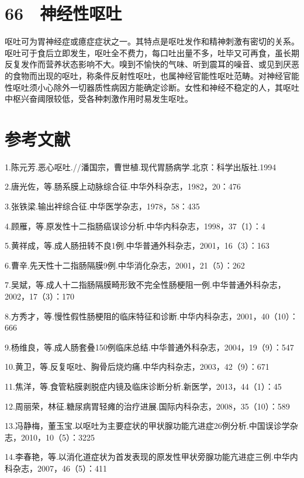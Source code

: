 \protect\hypertarget{text00164.html}{}{}

\section{66　神经性呕吐}

呕吐可为胃神经症或癔症症状之一。其特点是呕吐发作和精神刺激有密切的关系。呕吐可于食后立即发生，呕吐全不费力，每口吐出量不多，吐毕又可再食，虽长期反复发作而营养状态影响不大。嗅到不愉快的气味、听到震耳的噪音、或见到厌恶的食物而出现的呕吐，称条件反射性呕吐，也属神经官能性呕吐范畴。对神经官能性呕吐须小心除外一切器质性病因方能确定诊断。女性和神经不稳定的人，其呕吐中枢兴奋阈限较低，受各种刺激作用时易发生呕吐。

\protect\hypertarget{text00165.html}{}{}

\section{参考文献}

1.陈元芳.恶心呕吐.//潘国宗，曹世植.现代胃肠病学.北京：科学出版社.1994

2.唐光佐，等.肠系膜上动脉综合征.中华外科杂志，1982，20：476

3.张铁梁.输出袢综合征.中华医学杂志，1978，58：435

4.顾雁，等.原发性十二指肠癌误诊分析.中华内科杂志，1998，37（1）：4

5.黄祥成，等.成人肠扭转不良1例.中华普通外科杂志，2001，16（3）：163

6.曹辛.先天性十二指肠隔膜9例.中华消化杂志，2001，21（5）：262

7.吴斌，等.成人十二指肠隔膜畸形致不完全性肠梗阻一例.中华普通外科杂志，2002，17（3）：170

8.方秀才，等.慢性假性肠梗阻的临床特征和诊断.中华内科杂志，2001，40（10）：666

9.杨维良，等.成人肠套叠150例临床总结.中华普通外科杂志，2004，19（9）：547

10.黄卫，等.反复呕吐、胸骨后烧灼痛.中华内科杂志，2003，42（9）：671

11.焦洋，等.食管粘膜剥脱症内镜及临床诊断分析.新医学，2013，44（1）：45

12.周丽荣，林征.糖尿病胃轻瘫的治疗进展.国际内科杂志，2008，35（10）：589

13.冯静梅，董玉宝.以呕吐为主要症状的甲状腺功能亢进症26例分析.中国误诊学杂志，2010，10（5）：3225

14.李春艳，等.以消化道症状为首发表现的原发性甲状旁腺功能亢进症三例.中华内科杂志，2007，46（5）：411

